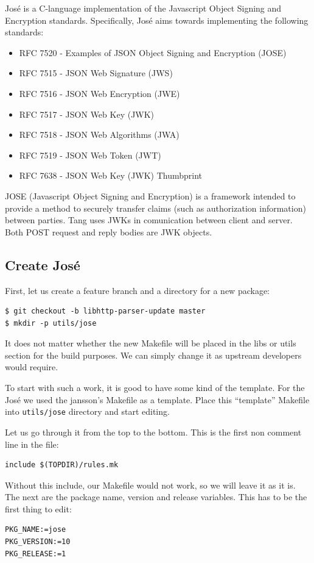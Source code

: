 José is a C-language implementation of the Javascript Object Signing and Encryption standards.
Specifically, José aims towards implementing the following standards:
\begin{itemize}
    \item RFC 7520 - Examples of JSON Object Signing and Encryption (JOSE) \cite{RFC7520}
    \item RFC 7515 - JSON Web Signature (JWS)        \cite{RFC7515}
    \item RFC 7516 - JSON Web Encryption (JWE)       \cite{RFC7516}
    \item RFC 7517 - JSON Web Key (JWK)              \cite{RFC7517}
    \item RFC 7518 - JSON Web Algorithms (JWA)       \cite{RFC7518}
    \item RFC 7519 - JSON Web Token (JWT)            \cite{RFC7519}
    \item RFC 7638 - JSON Web Key (JWK) Thumbprint   \cite{RFC7638}
\end{itemize}

JOSE (Javascript Object Signing and Encryption) is a framework intended to provide a method to securely transfer claims (such as authorization information) between parties.
Tang uses JWKs in comunication between client and server.
Both POST request and reply bodies are JWK objects\cite{jose_prog}.



\subsection{Create José}\label{jose}

First, let us create a feature branch and a directory for a new package:
\begin{lstlisting}[columns=fixed,basicstyle=\ttfamily\footnotesize,tabsize=4,backgroundcolor=\color{yellow!10}]
$ git checkout -b libhttp-parser-update master
$ mkdir -p utils/jose
\end{lstlisting}
It does not matter whether the new Makefile will be placed in the libs or utils section for the build purposes.
We can simply change it as upstream developers would require.

To start with such a work, it is good to have some kind of the template.
For the José we used the jansson's Makefile as a template.
Place this “template” Makefile into {\tt utils/jose} directory and start editing.

Let us go through it from the top to the bottom.
This is the first non comment line in the file:
\begin{lstlisting}[columns=fixed,basicstyle=\ttfamily\footnotesize,tabsize=4,backgroundcolor=\color{yellow!10}]
include $(TOPDIR)/rules.mk
\end{lstlisting}
Without this include, our Makefile would not work, so we will leave it as it is.
The next are the package name, version and release variables.
This has to be the first thing to edit:
\begin{lstlisting}[columns=fixed,basicstyle=\ttfamily\footnotesize,tabsize=4,backgroundcolor=\color{yellow!10}]
PKG_NAME:=jose
PKG_VERSION:=10
PKG_RELEASE:=1
\end{lstlisting}


